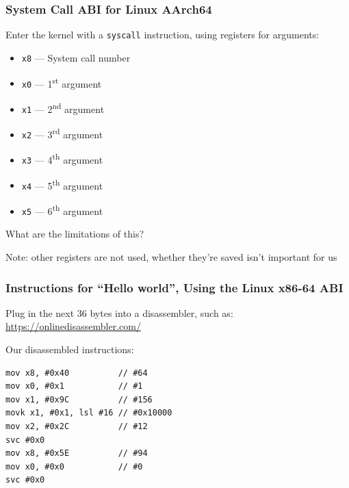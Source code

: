   \begin{frame}
    \frametitle{System Call ABI for Linux AArch64}

    Enter the kernel with a \texttt{syscall} instruction, using registers for
    arguments:

    \begin{itemize}
      \item \texttt{x8} --- System call number
      \item \texttt{x0} --- 1\textsuperscript{st} argument
      \item \texttt{x1} --- 2\textsuperscript{nd} argument
      \item \texttt{x2} --- 3\textsuperscript{rd} argument
      \item \texttt{x3} --- 4\textsuperscript{th} argument
      \item \texttt{x4} --- 5\textsuperscript{th} argument
      \item \texttt{x5} --- 6\textsuperscript{th} argument
    \end{itemize}

    What are the limitations of this?

    \vspace{2em}

    Note: other registers are not used, whether they're saved isn't important
    for us
  \end{frame}

  \begin{frame}[fragile]
    \frametitle{Instructions for ``Hello world'', Using the Linux x86-64 ABI}

    Plug in the next 36 bytes into a disassembler, such as:
    \url{https://onlinedisassembler.com/}

    \vspace{2em}

    Our disassembled instructions:
    \begin{lstlisting}[xleftmargin=2em]
mov x8, #0x40          // #64
mov x0, #0x1           // #1
mov x1, #0x9C          // #156
movk x1, #0x1, lsl #16 // #0x10000
mov x2, #0x2C          // #12
svc #0x0
mov x8, #0x5E          // #94
mov x0, #0x0           // #0
svc #0x0
    \end{lstlisting}
  \end{frame}

